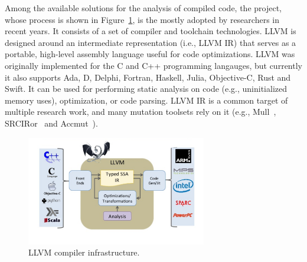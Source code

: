 
Among the available solutions for the analysis of compiled code, the  project, whose process is shown in Figure~\ref{fig:compileTime:llvm}, is the mostly adopted by researchers in recent years. It consists of a set of compiler and toolchain technologies. LLVM is designed around an intermediate representation (i.e., LLVM IR) that serves as a portable, high-level assembly language useful for code optimizations. LLVM was originally implemented for the C and C++ programming langauges, but currently it also supports Ada, D, Delphi, Fortran, Haskell, Julia, Objective-C, Rust and Swift. It can be used for performing static analysis on code (e.g., uninitialized memory uses), optimization, or code parsing.
LLVM IR is a common target of multiple research work, and many mutation toolsets rely on it (e.g., Mull~\cite{denisov2018mull}, SRCIRor~\cite{hariri2018srciror,hariri2019comparing} and Accmut~\cite{wang2017faster}).

	\begin{figure}
	\centering
		\includegraphics[width=0.7\textwidth]{images/llvm}
		\caption{LLVM compiler infrastructure.}
		\label{fig:compileTime:llvm}
	\end{figure}





